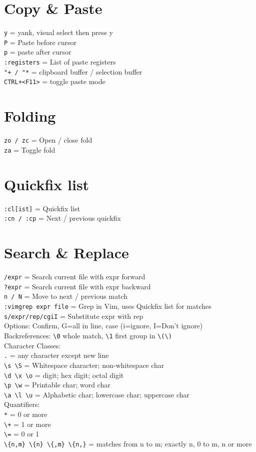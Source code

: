 \documentclass[10pt,DIV=50,landscape,pagesize,parskip=off]{scrartcl}
\newcommand\co[1]{\texttt{#1}}
\newcommand\coe[2]{\co{#1} = #2}
\begin{document}
\begin{multicols}{3}
\section{Copy \& Paste}
\coe{y}{yank, visual select then press y}\\
\coe{P}{Paste before cursor}\\
\coe{p}{paste after cursor}\\
\lstinline|:registers| = List of paste registers\\
\lstinline|"+ / "*| = clipboard buffer / selection buffer\\
\coe{CTRL+<F11>}{toggle paste mode}

\section{Folding}
\coe{zo / zc}{Open / close fold}\\
\coe{za}{Toggle fold}

\section{Quickfix list}
\coe{:cl[ist]}{Quickfix list}\\
\coe{:cn / :cp}{Next / previous quickfix}

\section{Search \& Replace}
\coe{/expr}{Search current file with expr forward}\\
\coe{?expr}{Search current file with expr backward}\\
\coe{n / N}{Move to next / previous match}\\
\coe{:vimgrep expr file}{Grep in Vim, uses Quickfix list for matches}\\
\coe{s/expr/rep/cgiI}{Substitute expr with rep\\Options: Confirm, G=all in line, case (i=ignore, I=Don't ignore)}\\
Backreferences: \lstinline|\0| whole match, \lstinline|\1| first group in \lstinline|\(\)|\\
Character Classes:\\
\coe{.}{any character except new line}\\
\lstinline|\s \S| = Whitespace character; non-whitespace char\\
\lstinline|\d \x \o| = digit; hex digit; octal digit\\
\lstinline|\p \w| = Printable char; word char\\
\lstinline|\a \l \u| = Alphabetic char; lowercase char; uppercase char\\
Quantifiers:\\
\lstinline|*| = 0 or more\\
\lstinline|\+| = 1 or more\\
\lstinline|\=| = 0 or 1\\
\lstinline|\{n,m} \{n} \{,m} \{n,}| = matches from n to m; exactly n, 0 to m, n or more


\end{multicols}
\end{document}
